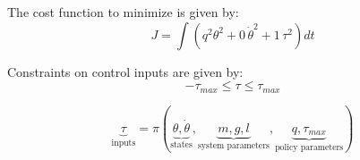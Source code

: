The cost function to minimize is given by:
\begin{equation}
J = \int{( q^2 \theta^2 + 0 \, \dot{\theta}^2 + 1 \, \tau^2 ) dt }
\end{equation}

Constraints on control inputs are given by:
\begin{equation}
- \tau_{max} \leq \tau \leq \tau_{max}
\end{equation}

\begin{equation}
\underbrace{\tau}_{\text{inputs}}
=
\pi \left(
\underbrace{ \theta, \dot{\theta} }_{\text{states}},
\underbrace{ m , g , l }_{\text{system parameters}},
\underbrace{ q , \tau_{max} }_{\text{policy parameters}}
\right)
\end{equation}

